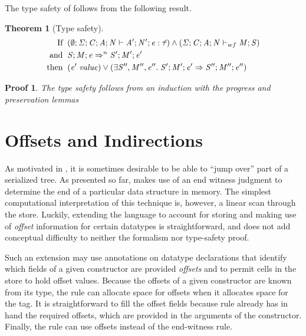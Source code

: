 \documentclass[showabstract,showacknowledgments,showpreface,showdedication]{iuphd}
\newtheorem{theorem}{Theorem}[section]
\theoremstyle{nonumberplain}
\newtheorem{nproof}{Proof}
\begin{document}
The type safety of \ourcalc{} follows from the following result.

\begin{theorem}[Type safety]
  \label{theorem:type-safety}
\begin{displaymath}
  \begin{aligned}
  \text{If} \;\; & (\emptyset;\mathit{\Sigma};\mathit{C};\mathit{A};\mathit{N} \vdash \mathit{A}';\mathit{N}';\mathit{e} : \mathit{\hat{\tau}}) \wedge
                   (\mathit{\Sigma};\mathit{C};\mathit{A};\mathit{N} \vdash_{wf} \mathit{M};\mathit{S}) \\
  \text{and} \;\; & \mathit{S};\mathit{M};\mathit{e} \Rightarrow^n \mathit{S}';\mathit{M}';\mathit{e}' \\
  \text{then} \;\; & (\mathit{e}' \; \mathit{value}) \vee 
                     (\exists \mathit{S}'', \mathit{M}'', \mathit{e}'' . \; \mathit{S}';\mathit{M}';\mathit{e}' \Rightarrow \mathit{S}'';\mathit{M}'';\mathit{e}'')
  \end{aligned}
  \end{displaymath}  
\end{theorem}

\begin{nproof}
  The type safety follows from an induction with
  the progress and preservation lemmas 
\end{nproof}

\section{Offsets and Indirections}\label{sec:indirections}

As motivated in , it is sometimes desirable to be
able to ``jump over'' part of a serialized tree.
%
As presented so far, \ourcalc{} makes use of an end witness judgment
to determine the end of a particular data structure in memory.
%
The simplest computational interpretation of this technique is,
however, a linear scan through the store.
%
Luckily, extending the language to account for storing and making use
of \emph{offset} information for certain datatypes is
straightforward, and does not add conceptual difficulty to
neither the formalism nor type-safety proof.

Such an extension may use annotations on datatype declarations
that identify which fields of a given constructor are provided \emph{offsets}
and to permit cells in the store to hold offset values.
%
Because the offsets of a given constructor are known from its type,
the \textsc{\dletloctag{}} rule can allocate space for offsets when it
allocates space for the tag.
%
It is straightforward to fill the offset fields because \textsc{\ddatacon{}}
rule already has in hand the required offsets, which are provided in
the arguments of the constructor.
%
Finally, the \textsc{\dcase{}} rule can use offsets instead of 
the end-witness rule.
\end{document}
